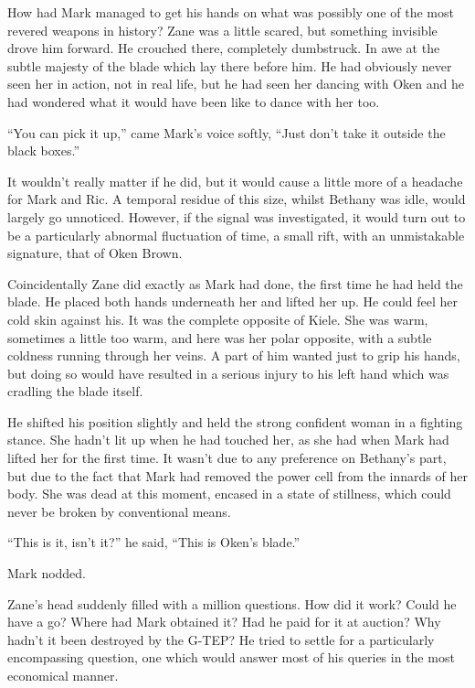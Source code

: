 How had Mark managed to get his hands on what was possibly one of the most revered weapons in history?  Zane was a little scared, but something invisible drove him forward.  He crouched there, completely dumbstruck.  In awe at the subtle majesty of the blade which lay there before him.  He had obviously never seen her in action, not in real life, but he had seen her dancing with Oken and he had wondered what it would have been like to dance with her too.

``You can pick it up,'' came Mark's voice softly, ``Just don't take it outside the black boxes.''

It wouldn't really matter if he did, but it would cause a little more of a headache for Mark and Ric.  A temporal residue of this size, whilst Bethany was idle, would largely go unnoticed.  However, if the signal was investigated, it would turn out to be a particularly abnormal fluctuation of time, a small rift, with an unmistakable signature, that of Oken Brown.

Coincidentally Zane did exactly as Mark had done, the first time he had held the blade.  He placed both hands underneath her and lifted her up.  He could feel her cold skin against his.  It was the complete opposite of Kiele.  She was warm, sometimes a little too warm, and here was her polar opposite, with a subtle coldness running through her veins.  A part of him wanted just to grip his hands, but doing so would have resulted in a serious injury to his left hand which was cradling the blade itself.

He shifted his position slightly and held the strong confident woman in a fighting stance.  She hadn't lit up when he had touched her, as she had when Mark had lifted her for the first time.  It wasn't due to any preference on Bethany's part, but due to the fact that Mark had removed the power cell from the innards of her body.  She was dead at this moment, encased in a state of stillness, which could never be broken by conventional means.

``This is it, isn't it?'' he said, ``This is Oken's blade.''

Mark nodded.

Zane's head suddenly filled with a million questions.  How did it work?  Could he have a go?  Where had Mark obtained it?  Had he paid for it at auction?  Why hadn't it been destroyed by the G-TEP?  He tried to settle for a particularly encompassing question, one which would answer most of his queries in the most economical manner.


